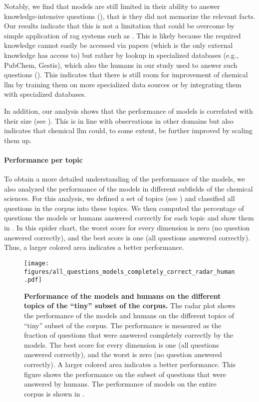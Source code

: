 \documentclass[11pt, oneside]{article}
\begin{document}
\begin{refsection}
Notably, we find that models are still limited in their ability to answer knowledge-intensive questions (), that is they did not memorize the relevant facts. Our results indicate that this is not a limitation that could be overcome by simple application of \gls{rag} systems such as \PaperQATwo. This is likely because the required knowledge cannot easily be accessed via papers (which is the only external knowledge \PaperQATwo has access to) but rather by lookup in specialized databases (e.g., PubChem, Gestis), which also the humans in our study used to answer such questions ().
This indicates that there is still room for improvement of chemical \gls{llm} by training them on more specialized data sources or by integrating them with specialized databases.

In addition, our analysis shows that the performance of models is correlated with their size (see ). This is in line with observations in other domains but also indicates that chemical \gls{llm} could, to some extent, be further improved by scaling them up.

\paragraph{Performance per topic} To obtain a more detailed understanding of the performance of the models, we also analyzed the performance of the models in different subfields of the chemical sciences.
For this analysis, we defined a set of topics (see ) and  classified all questions in the \chembench corpus into these topics.
We then computed the percentage of questions the models or humans answered correctly for each topic and show them in .
In this spider chart, the worst score for every dimension is zero (no question answered correctly), and the best score is one (all questions answered correctly). Thus, a larger colored area indicates a better performance.

\begin{figure}[!h]
    \centering
    \texttt{[image: figures/all\_questions\_models\_completely\_correct\_radar\_human.pdf]}
    \caption{\textbf{Performance of the models and humans on the different topics of the \enquote{tiny} subset of the \chembench corpus.} The radar plot shows the performance of the models and humans on the different topics of \enquote{tiny} subset of the \chembench corpus. The performance is measured as the fraction of questions that were answered completely correctly by the models.
    The best score for every dimension is one (all questions answered correctly), and the worst is zero (no question answered correctly). A larger colored area indicates a better performance.
    This figure shows the performance on the subset of questions that were answered by humans. The performance of models on the entire corpus is shown in .
    }
    \label{fig:all_questions_models_completely_correct_radar_human}
\end{figure}


\end{refsection}
\end{document}
